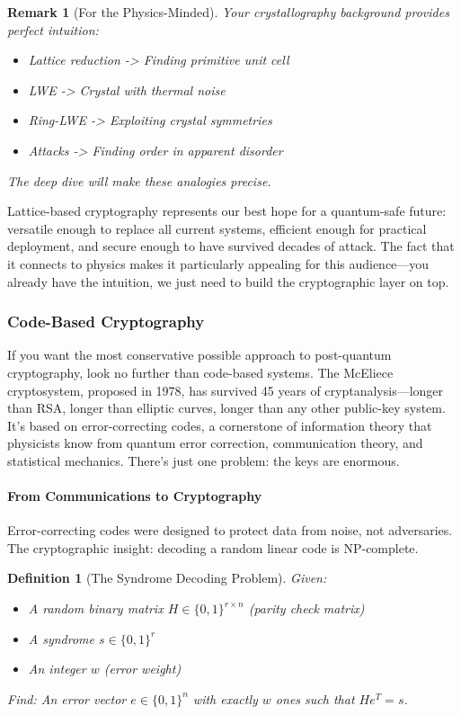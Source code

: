 \documentclass[11pt,a4paper]{article}
\newtheorem{definition}{Definition}
\newtheorem{remark}{Remark}
\begin{document}
\begin{remark}[For the Physics-Minded]
Your crystallography background provides perfect intuition:
\begin{itemize}
    \item Lattice reduction -> Finding primitive unit cell
    \item LWE -> Crystal with thermal noise
    \item Ring-LWE -> Exploiting crystal symmetries
    \item Attacks -> Finding order in apparent disorder
\end{itemize}
The deep dive will make these analogies precise.
\end{remark}

Lattice-based cryptography represents our best hope for a quantum-safe future: versatile enough to replace all current systems, efficient enough for practical deployment, and secure enough to have survived decades of attack. The fact that it connects to physics makes it particularly appealing for this audience—you already have the intuition, we just need to build the cryptographic layer on top.

\subsubsection{Code-Based Cryptography}

If you want the most conservative possible approach to post-quantum cryptography, look no further than code-based systems. The McEliece cryptosystem, proposed in 1978, has survived 45 years of cryptanalysis—longer than RSA, longer than elliptic curves, longer than any other public-key system. It's based on error-correcting codes, a cornerstone of information theory that physicists know from quantum error correction, communication theory, and statistical mechanics. There's just one problem: the keys are enormous.

\paragraph{From Communications to Cryptography}

Error-correcting codes were designed to protect data from noise, not adversaries. The cryptographic insight: decoding a random linear code is NP-complete.

\begin{definition}[The Syndrome Decoding Problem]
Given:
\begin{itemize}
    \item A random binary matrix $H \in \{0,1\}^{r \times n}$ (parity check matrix)
    \item A syndrome $s \in \{0,1\}^r$
    \item An integer $w$ (error weight)
\end{itemize}
Find: An error vector $e \in \{0,1\}^n$ with exactly $w$ ones such that $He^T = s$.
\end{definition}
\end{document}
